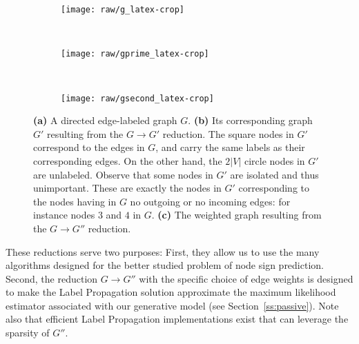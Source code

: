 \begin{figure*}[t]
  \centering
  \begin{subfigure}[b]{0.28\textwidth}
    \centering \texttt{[image: raw/g\_latex-crop]} \caption{}
  \end{subfigure}~
  \begin{subfigure}[b]{0.30\textwidth}
    \centering \texttt{[image: raw/gprime\_latex-crop]}
    \caption{\label{fig:troll_reduction_gprime}}
  \end{subfigure}~
  \begin{subfigure}[b]{0.36\textwidth}
    \centering \texttt{[image: raw/gsecond\_latex-crop]}
    \caption{\label{fig:troll_reduction_gsecond}}
  \end{subfigure}
  \caption{\label{f:etnr}
    \textbf{(a)} A directed edge-labeled graph $G$. \textbf{(b)} Its corresponding graph $G'$
    resulting from the $G\rightarrow G'$ reduction. The square nodes in $G'$ correspond to the
    edges in $G$, and carry the same labels as their corresponding edges. On the other hand, the
    $2|V|$ circle nodes in $G'$ are unlabeled. Observe that some nodes in $G'$ are isolated and
    thus unimportant. These are exactly the nodes in $G'$ corresponding to the nodes having in $G$
    no outgoing or no incoming edges: for instance nodes $3$ and $4$ in $G$. \textbf{(c)} The
    weighted graph resulting from the $G\rightarrow G''$ reduction.
  }
\end{figure*}

\iffalse
  While we could make this
argument more quantitative, here we simply observe that if each node in $G$ tends to be either
troll or trustworthy, then few labels from the incoming and outgoing edges of each such node are
sufficient to predict the labels on the remaining edges in $G$, and this translates to a small
cutsize\footnote{Recall that the cutsize of an undirected node-labeled graph $G'(Y)$ is the number
of edges in $G'$ connecting nodes having mismatching labels.} of $G'(Y)$ over the nodes
corresponding to the edges in $G$ (the colored squares in \autoref{fig:troll_reduction_gprime}).
\fi

These reductions serve two purposes: First, they allow us to
use the many algorithms designed for the better studied problem of node sign prediction. Second,
the reduction $G\rightarrow G''$ with the specific choice of edge weights is designed to make the
Label Propagation solution approximate the maximum likelihood estimator associated with our
generative model (see Section~\ref{ss:passive}). Note also that efficient Label Propagation
implementations exist that can leverage the sparsity of $G''$.

